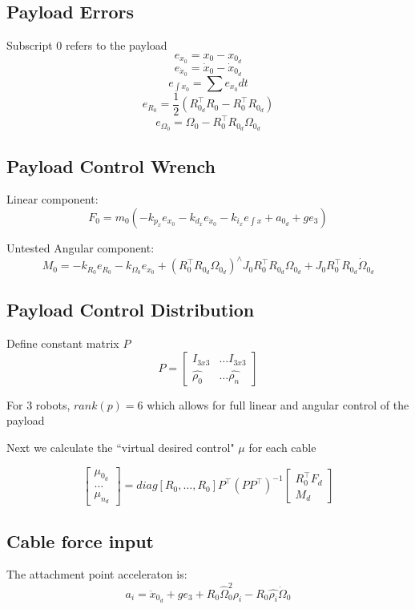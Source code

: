 \documentclass[12pt]{article}
\begin{document}
\subsection{Payload Errors}
Subscript 0 refers to the payload
$$ e_{x_0} = x_0 - x_{0_d} $$
$$ e_{\dot{x}_0} = \dot{x}_0 - \dot{x}_{0_d}$$ 
$$ e_{\int{x_0}} = \sum e_{x_0} dt $$
$$ e_{R_0} = \frac{1}{2} (R_{0_d}^\top R_0 - R_0^\top R_{0_d}) $$ 
$$ e_{\Omega_0} = \Omega_0 - R_0^\top R_{0_d} \Omega_{0_d} $$

\subsection{Payload Control Wrench}

Linear component:
$$ F_0 = m_0 (-k_{p_x} e_{x_0} - k_{d_x} e_{\dot{x}_0} - k_{i_x} e_{\int{x}} + a_{0_d} + ge_3) $$

Untested Angular component:
$$ M_0 = -k_{R_0} e_{R_0} - k_{\Omega_0} e_{x_0} + (R_0^\top R_{0_d} \Omega_{0_d})^\wedge J_0R_0^\top R_{0_d} \Omega_{0_d} + J_0R_0^\top R_{0_d} \dot{\Omega}_{0_d}$$

\subsection{Payload Control Distribution}
Define constant matrix $P$
$$
P = \begin{bmatrix}
I_{3x3} & \dots I_{3x3} \\
\hat{\rho_0} & \dots \hat{\rho_n}
\end{bmatrix}
$$

For 3 robots, $rank(p) = 6$ which allows for full linear and angular control of the payload

Next we calculate the ``virtual desired control" $\mu$ for each cable

$$
\begin{bmatrix}
	\mu_{0_d} \\ \dots \\ \mu_{n_d}
\end{bmatrix}
= diag[R_0, \dots, R_0] P^\top (PP^\top)^{-1}
\begin{bmatrix}
R_0^\top F_d \\
M_d
\end{bmatrix}
$$

\subsection{Cable force input}
The attachment point acceleraton is:
$$a_i = \ddot{x}_{0_d} + ge_3 + R_0 \hat{\Omega}_0^2 \rho_i - R_0 \hat{\rho_i} \dot{\Omega}_0 $$
\end{document}
